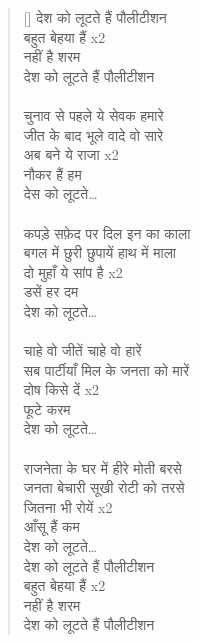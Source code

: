 \begin{verse}[\versewidth]\texthindi{
देश को लूटते हैं पौलीटीशन\\
बहुत बेहया हैं x2\\
नहीं है शरम\\
देश को लूटते हैं पौलीटीशन\\
\\
चुनाव से पहले ये सेवक हमारे\\
जीत के बाद भूले वादे वो सारे\\
अब बने ये राजा x2\\
नौकर हैं हम\\
देस को लूटते…\\
\\
कपड़े सफ़ेद पर दिल इन का काला\\
बगल में छुरी छुपायें हाथ में माला\\
दो मुहाँ ये सांप है x2\\
डसें हर दम\\
देश को लूटते…\\
\\
चाहे वो जीतें चाहे वो हारें\\
सब पार्टीयाँ मिल के जनता को मारें\\
दोष किसे दें x2\\
फूटे करम\\
देश को लूटते…\\
\\
राजनेता के घर में हीरे मोती बरसे\\
जनता बेचारी सूखी रोटी को तरसे\\
जितना भी रोयें x2\\
आँसू हैं कम\\
देश को लूटते…\\
देश को लूटते हैं पौलीटीशन\\
बहुत बेहया हैं x2\\
नहीं है शरम\\
देश को लूटते हैं पौलीटीशन
}\end{verse}

